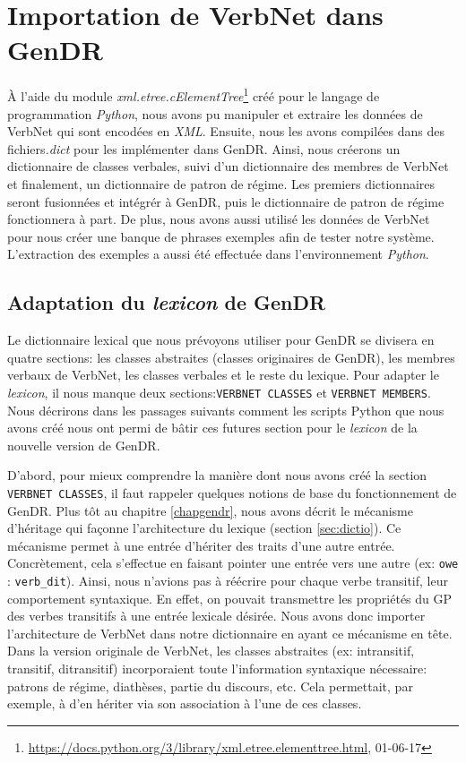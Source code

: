 \chapter{Importation de VerbNet dans GenDR}\label{ch:python}

À l'aide du module \emph{xml.etree.cElementTree}\footnote{\url{https://docs.python.org/3/library/xml.etree.elementtree.html}, 01-06-17} créé pour le langage de programmation \emph{Python}, nous avons pu manipuler et extraire les données de VerbNet qui sont encodées en \emph{XML}. Ensuite, nous les avons compilées dans des fichiers\emph{.dict} pour les implémenter dans GenDR. Ainsi, nous créerons un dictionnaire de classes verbales, suivi d'un dictionnaire des membres de VerbNet et finalement, un dictionnaire de patron de régime. Les premiers dictionnaires seront fusionnées et intégrér à GenDR, puis le dictionnaire de patron de régime fonctionnera à part. De plus, nous avons aussi utilisé les données de VerbNet pour nous créer une banque de phrases exemples afin de tester notre système. L'extraction des exemples a aussi été effectuée dans l'environnement \emph{Python}.
 
\section{Adaptation du \emph{lexicon} de GenDR}

Le dictionnaire lexical que nous prévoyons utiliser pour GenDR se divisera en quatre sections: les classes abstraites (classes originaires de GenDR), les membres verbaux de VerbNet, les classes verbales et le reste du lexique. Pour adapter le \emph{lexicon}, il nous manque deux sections:\texttt{VERBNET CLASSES} et \texttt{VERBNET MEMBERS}. Nous décrirons dans les passages suivants comment les scripts Python que nous avons créé nous ont permi de bâtir ces futures section pour le \emph{lexicon} de la nouvelle version de GenDR.

D'abord, pour mieux comprendre la manière dont nous avons créé la section \texttt{VERBNET CLASSES}, il faut rappeler quelques notions de base du fonctionnement de GenDR. Plus tôt au chapitre \ref{chapgendr}, nous avons décrit le mécanisme d'héritage qui façonne l'architecture du lexique (section \ref{sec:dictio}). Ce mécanisme permet à une entrée d'hériter des traits d'une autre entrée. Concrètement, cela s'effectue en faisant pointer une entrée vers une autre (ex: \texttt{owe} : \texttt{verb\_dit}). Ainsi, nous n'avions pas à réécrire pour chaque verbe transitif, leur comportement syntaxique. En effet, on pouvait transmettre les propriétés du \ac{GP} des verbes transitifs à une entrée lexicale désirée. Nous avons donc importer l'architecture de VerbNet dans notre dictionnaire en ayant ce mécanisme en tête. Dans la version originale de VerbNet, les classes abstraites (ex: intransitif, transitif, ditransitif) incorporaient toute l'information syntaxique nécessaire: patrons de régime, diathèses, partie du discours, etc. Cela permettait, par exemple, à  d'en hériter via son association à l'une de ces classes.  

